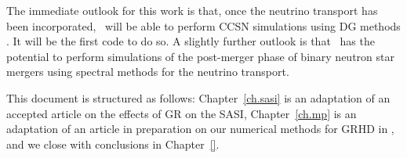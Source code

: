 The immediate outlook for this work is that, once the neutrino transport
has been incorporated, \thornado\ will be able to perform CCSN simulations
using DG methods .
It will be the first code to do so.
A slightly further outlook is that \thornado\ has the potential to perform
simulations of the post-merger phase of binary neutron star mergers
using spectral methods  for the neutrino transport.

This document  is structured as follows: Chapter~\ref{ch.sasi} is an adaptation
of an accepted article  on the effects of GR on the SASI,
Chapter~\ref{ch.mp} is an adaptation of an article in preparation  on our
numerical methods for GRHD in \thornado,
and we close with conclusions in Chapter~\ref{}.

